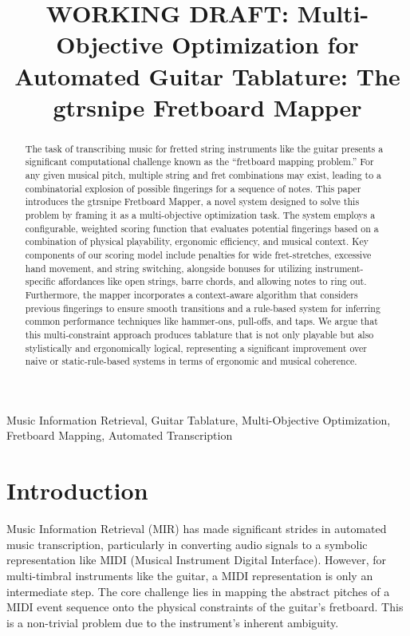 \documentclass[conference]{IEEEtran}
\title{WORKING DRAFT: Multi-Objective Optimization for Automated Guitar Tablature: The gtrsnipe Fretboard Mapper}
\author{
\IEEEauthorblockN{Scott VanRavenswaay}
\IEEEauthorblockA{Email: scottvr@gmail.com}
}
\begin{document}
\maketitle

\begin{abstract}
The task of transcribing music for fretted string instruments like the guitar presents a significant computational challenge known as the ``fretboard mapping problem.'' For any given musical pitch, multiple string and fret combinations may exist, leading to a combinatorial explosion of possible fingerings for a sequence of notes. This paper introduces the gtrsnipe Fretboard Mapper, a novel system designed to solve this problem by framing it as a multi-objective optimization task. The system employs a configurable, weighted scoring function that evaluates potential fingerings based on a combination of physical playability, ergonomic efficiency, and musical context. Key components of our scoring model include penalties for wide fret-stretches, excessive hand movement, and string switching, alongside bonuses for utilizing instrument-specific affordances like open strings, barre chords, and allowing notes to ring out. Furthermore, the mapper incorporates a context-aware algorithm that considers previous fingerings to ensure smooth transitions and a rule-based system for inferring common performance techniques like hammer-ons, pull-offs, and taps. We argue that this multi-constraint approach produces tablature that is not only playable but also stylistically and ergonomically logical, representing a significant improvement over naive or static-rule-based systems in terms of ergonomic and musical coherence.
\end{abstract}

\begin{IEEEkeywords}
Music Information Retrieval, Guitar Tablature, Multi-Objective Optimization, Fretboard Mapping, Automated Transcription
\end{IEEEkeywords}

\section{Introduction}

Music Information Retrieval (MIR) has made significant strides in automated music transcription, particularly in converting audio signals to a symbolic representation like MIDI (Musical Instrument Digital Interface). However, for multi-timbral instruments like the guitar, a MIDI representation is only an intermediate step. The core challenge lies in mapping the abstract pitches of a MIDI event sequence onto the physical constraints of the guitar's fretboard. This is a non-trivial problem due to the instrument's inherent ambiguity.
\end{document}
